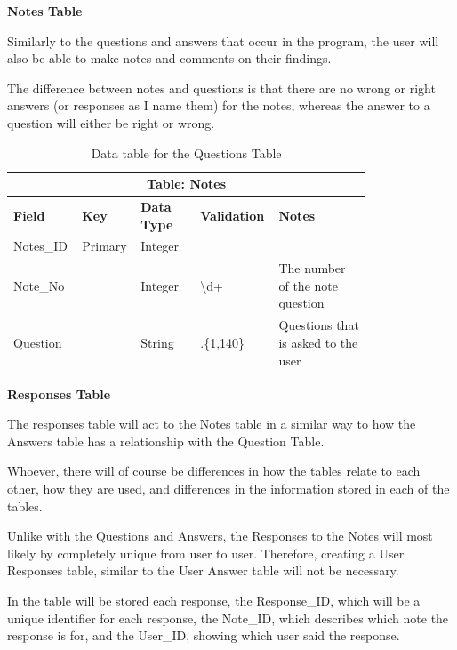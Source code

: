 \documentclass{article}
\begin{document}
\clearpage
\textbf{Notes Table}

Similarly to the questions and answers that occur in the program, the user will also be able to make notes and comments on their findings.

The difference between notes and questions is that there are no wrong or right answers (or responses as I name them) for the notes, whereas the answer to a question will either be right or wrong.

\begin{table}[ht]
    \centering
    \begin{tabular}{ | p{0.15\linewidth} | p{0.1\linewidth} | p{0.16\linewidth} | p{0.14\linewidth} | p{0.25\linewidth} | }
    \hline
    \multicolumn{5}{|c|}{\textbf{Table: Notes}}\\
    \hline
    \hline
    \textbf{Field} & \textbf{Key} & \textbf{Data Type} & \textbf{Validation} & \textbf{Notes} \\
    \hline
    Notes\_ID & Primary & Integer & & \\
    \hline
    Note\_No & & Integer & \textbackslash d+ & The number of the note question\\
    \hline
    Question & & String & .\{1,140\} & Questions that is asked to the user\\
    \hline
    \end{tabular}
    \caption{Data table for the Questions Table}
\end{table}

\textbf{Responses Table}

The responses table will act to the Notes table in a similar way to how the Answers table has a relationship with the Question Table.

Whoever, there will of course be differences in how the tables relate to each other, how they are used, and differences in the information stored in each of the tables.

Unlike with the Questions and Answers, the Responses to the Notes will most likely by completely unique from user to user. Therefore, creating a User Responses table, similar to the User Answer table will not be necessary.

In the table will be stored each response, the Response\_ID, which will be a unique identifier for each response, the Note\_ID, which describes which note the response is for, and the User\_ID, showing which user said the response.
\end{document}
